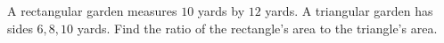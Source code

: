A rectangular garden measures $10$ yards by $12$ yards. A triangular garden has sides $6,8,10$ yards. Find the ratio of the rectangle's area to the triangle's area.
